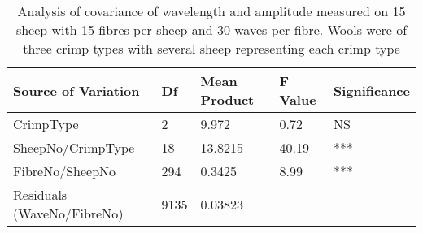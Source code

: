 %

\begin{table}[htp]
\centering
\caption{Analysis of covariance of wavelength and amplitude measured on 15 sheep with 15 fibres per sheep and 30 waves per fibre. Wools were of three crimp types with several sheep representing each crimp type}
\label{tab:sfwavlamplancov}
\vspace{0.1in}
\begin{tabular}{|p{1.4in}|p{0.4in}|p{0.7in}|p{0.4in}|p{0.8in}|} \hline
     Source of Variation & Df &  Mean Product  & F Value  & Significance  \\  \hline
 CrimpType & 2 &  9.972 & 0.72 & NS  \\
 SheepNo/CrimpType & 18 &   13.8215 &  40.19 & ***    \\ 
 FibreNo/SheepNo & 294 &  0.3425 & 8.99 & ***  \\
 Residuals (WaveNo/FibreNo) & 9135 &  0.03823 & & \\ \hline
\end{tabular}
\end{table}

%
